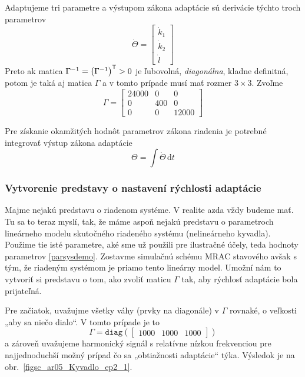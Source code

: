 \documentclass[a4paper, 10pt, ]{article}
\begin{document}
Adaptujeme tri parametre a výstupom zákona adaptácie sú derivácie týchto troch parametrov
\begin{equation}
	\dot \Theta = \begin{bmatrix} \dot{k}_1 \\ \dot{k}_2 \\ \dot{l} \end{bmatrix}
\end{equation}
Preto ak matica $\Gamma^{-1} = \left( \Gamma^{-1} \right)^{\mathsf{T}} > 0$ je ľubovolná, \emph{diagonálna}, kladne definitná, potom je taká aj matica $\Gamma$ a v tomto prípade musí mať rozmer $3\times3$. Zvoľme
\begin{equation}
	\Gamma =
    \begin{bmatrix}
		24000 & 0 & 0 \\
		0 & 400 & 0 \\
		0 & 0 & 12000
	\end{bmatrix}
\end{equation}



Pre získanie okamžitých hodnôt parametrov zákona riadenia je potrebné integrovať výstup zákona adaptácie
\begin{equation}
	\Theta = \int \dot \Theta \, \textrm{d}t
\end{equation}




\subsubsection{Vytvorenie predstavy o nastavení rýchlosti adaptácie}


Majme nejakú predstavu o riadenom systéme. V realite azda vždy budeme mať. Tu sa to teraz myslí, tak, že máme aspoň nejakú predstavu o parametroch lineárneho modelu skutočného riadeného systému (nelineárneho kyvadla). Použime tie isté parametre, aké sme už použili pre ilustračné účely, teda hodnoty parametrov \eqref{parsysdemo}. Zostavme simulačnú schému MRAC stavového avšak s tým, že riadeným systémom je priamo tento lineárny model. Umožní nám to vytvoriť si predstavu o tom, ako zvoliť maticu $\Gamma$ tak, aby rýchlosť adaptácie bola prijateľná.

Pre začiatok, uvažujme všetky váhy (prvky na diagonále) v $\Gamma$ rovnaké, o veľkosti „aby sa niečo dialo“. V tomto prípade je to
\begin{equation*}
    \Gamma = \texttt{diag}
    \left(
    \begin{bmatrix}
        1000 & 1000 & 1000
    \end{bmatrix}
    \right)
\end{equation*}
a zároveň uvažujeme harmonický signál s relatívne nízkou frekvenciou pre najjednoduchší možný prípad čo sa „obtiažnosti adaptácie“ týka. Výsledok je na obr.~\ref{figsc_ar05_Kyvadlo_ep2_1}.
\end{document}
